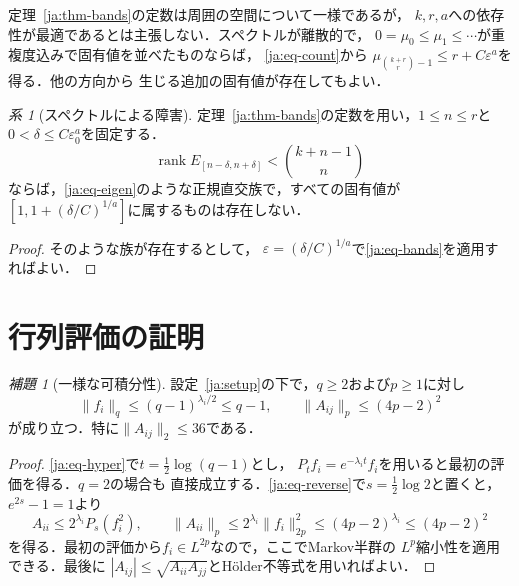 \documentclass[12pt]{amsart}
\theoremstyle{definition}
\theoremstyle{remark}
\numberwithin{equation}{section}
\newcommand{\rank}{\operatorname{rank}}
\theoremstyle{jpplain}
\newtheorem{jlem}[thm]{補題}
\newtheorem{jcor}[thm]{系}
\begin{document}
定理~\ref{ja:thm-bands}の定数は周囲の空間について一様であるが，
$k,r,a$への依存性が最適であるとは主張しない．スペクトルが離散的で，
$0=\mu_0\leq\mu_1\leq\cdots$が重複度込みで固有値を並べたものならば，
\eqref{ja:eq-count}から
$\mu_{\binom{k+r}{r}-1}\leq r+C\varepsilon^a$を得る．他の方向から
生じる追加の固有値が存在してもよい．

\begin{jcor}[スペクトルによる障害]\label{ja:cor-obstruction}
定理~\ref{ja:thm-bands}の定数を用い，$1\leq n\leq r$と
$0<\delta\leq C\varepsilon_0^a$を固定する．
\[
 \rank E_{[n-\delta,n+\delta]}<\binom{k+n-1}{n}
\]
ならば，\eqref{ja:eq-eigen}のような正規直交族で，すべての固有値が
$[1,1+(\delta/C)^{1/a}]$に属するものは存在しない．
\end{jcor}
\begin{proof}
そのような族が存在するとして，
$\varepsilon=(\delta/C)^{1/a}$で\eqref{ja:eq-bands}を適用すればよい．
\end{proof}

\section{行列評価の証明}

\begin{jlem}[一様な可積分性]\label{ja:lem-moments}
設定~\ref{ja:setup}の下で，$q\geq2$および$p\geq1$に対し
\begin{equation}\label{ja:eq-integrability}
 \|f_i\|_q\leq(q-1)^{\lambda_i/2}\leq q-1,
 \qquad \|A_{ij}\|_p\leq(4p-2)^2
\end{equation}
が成り立つ．特に$\|A_{ij}\|_2\leq36$である．
\end{jlem}
\begin{proof}
\eqref{ja:eq-hyper}で$t=\frac12\log(q-1)$とし，
$P_tf_i=e^{-\lambda_i t}f_i$を用いると最初の評価を得る．$q=2$の場合も
直接成立する．\eqref{ja:eq-reverse}で$s=\frac12\log2$と置くと，
$e^{2s}-1=1$より
\[
 A_{ii}\leq2^{\lambda_i}P_s(f_i^2),\qquad
 \|A_{ii}\|_p\leq2^{\lambda_i}\|f_i\|_{2p}^2
             \leq(4p-2)^{\lambda_i}\leq(4p-2)^2
\]
を得る．最初の評価から$f_i\in L^{2p}$なので，ここでMarkov半群の
$L^p$縮小性を適用できる．最後に
$|A_{ij}|\leq\sqrt{A_{ii}A_{jj}}$とHölder不等式を用いればよい．
\end{proof}
\end{document}
